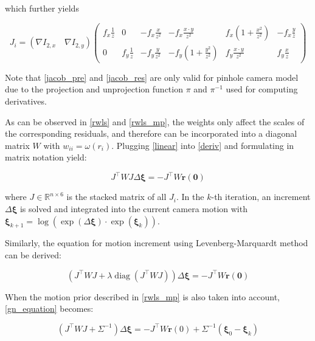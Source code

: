 \documentclass[acmsmall, nonacm, 11pt]{acmart}
\begin{document}
\noindent which further yields

\begin{equation}
J_i=\left(\nabla I_{2, x} \quad \nabla I_{2, y}\right)\left(
\begin{array}{cccccc}
{f_{x} \frac{1}{z}} & {0} & {-f_{x} \frac{x}{z^{2}}} & {-f_{x} \frac{x \cdot y}{z^{2}}} & {f_{x}\left(1+\frac{x^{2}}{z^{2}}\right)} & {-f_{x} \frac{y}{z}} \\
{0} & {f_{y} \frac{1}{z}} & {-f_{y} \frac{y}{z^{2}}} & {-f_{y}\left(1+\frac{y^{2}}{z^{2}}\right)} & {f_{y} \frac{x \cdot y}{z^{2}}} & {f_{y} \frac{x}{z}}
\end{array}\right)
\label{jacob_res}
\end{equation}

Note that \eqref{jacob_pre} and \eqref{jacob_res} are only valid for pinhole camera model due to the projection and unprojection function $\pi$ and $\pi^{-1}$ used for computing derivatives.

As can be observed in \eqref{rwls} and \eqref{rwls_mp}, the weights only affect the scales of the corresponding residuals, and therefore can be incorporated into a diagonal matrix $W$ with $w_{ii} = \omega(r_i)$. Plugging \eqref{linear} into \eqref{deriv} and formulating in matrix notation yield:

\begin{equation}
J^{\top} W J \Delta \boldsymbol{\xi}=-J^{\top} W \mathbf{r}(\mathbf{0})
\label{gn_equation}
\end{equation}

\noindent where $J \in \mathbb{R}^{n \times 6}$ is the stacked matrix of all $J_i$. In the $k$-th iteration, an increment $\Delta \boldsymbol{\xi}$ is solved and integrated into the current camera motion with $\boldsymbol{\xi}_{k+1} = \log \left(\exp (\Delta\boldsymbol{\xi}) \cdot \exp (\boldsymbol{\xi}_{k})\right)$.

Similarly, the equation for motion increment using Levenberg-Marquardt method can be derived:

\begin{equation}
\left(J^{\top} W J+\lambda \operatorname{diag}\left(J^{\top} W J\right)\right) \Delta \boldsymbol{\xi}=-J^{\top} W \mathbf{r}(\mathbf{0})
\end{equation}

When the motion prior described in \eqref{rwls_mp} is also taken into account, \eqref{gn_equation} becomes:

\begin{equation}
\left(J^{\top} W J+\Sigma^{-1}\right) \Delta \boldsymbol{\xi}=-J^{\top} W \mathbf{r}(0)+\Sigma^{-1}\left(\boldsymbol{\xi}_{0}-\boldsymbol{\xi}_{k}\right)
\end{equation}
\end{document}
